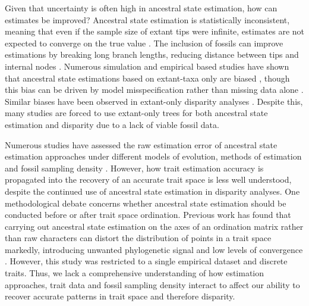 \documentclass[11pt, a4paper]{article}
\newcommand{\ASE}{Ancestral state estimation }
\newcommand{\ase}{ancestral state estimation }
\begin{document}
Given that uncertainty is often high in ancestral state estimation, how can estimates be improved?
\ASE is statistically inconsistent, meaning that even if the sample size of extant tips were infinite, estimates are not expected to converge on the true value \citep{ane2008analysis}.
The inclusion of fossils can improve estimations by breaking long branch lengths, reducing distance between tips and internal nodes \citep{finarelli2006ancestral,finarelli2013potential,joy2016ancestral, goswami2025morphological}.
Numerous simulation and empirical based studies have shown that ancestral state estimations based on extant-taxa only are biased \citep{webster2002testing,finarelli2006ancestral,albert2009fossils,betancur2015fossil,royer2016comparison,monson2022keeping,wisniewski2022extant,keating2023best}, though this bias can be driven by model misspecification rather than missing data alone \citep{goldberg2008phylogenetic, puttick2015fossils}.
Similar biases have been observed in extant-only disparity analyses \citep{mitchell2015extant}. 
Despite this, many studies are forced to use extant-only trees for both ancestral state estimation \citep{jetz2018interplay, amador2021evolution} and disparity \citep{harmon2010early,baker2015adaptive,smith2022evolution} due to a lack of viable fossil data.

Numerous studies have assessed the raw estimation error of \ase approaches under different models of evolution, methods of estimation and fossil sampling density \citep{elliot2014inferring,royer2016comparison, reyes2018testing, holland2020accuracy,keating2023best,boyko2026resolving}.
However, how trait estimation accuracy is propagated into the recovery of an accurate trait space is less well understood, despite the continued use of \ase in disparity analyses.
One methodological debate concerns whether \ase should be conducted before or after trait space ordination.
Previous work has found that carrying out \ase on the axes of an ordination matrix rather than raw characters can distort the distribution of points in a trait space markedly, introducing unwanted phylogenetic signal and low levels of convergence \citep{lloyd2018journeys}.
However, this study was restricted to a single empirical dataset and discrete traits.
Thus, we lack a comprehensive understanding of how estimation approaches, trait data and fossil sampling density interact to affect our ability to recover accurate patterns in trait space and therefore disparity.
\end{document}
